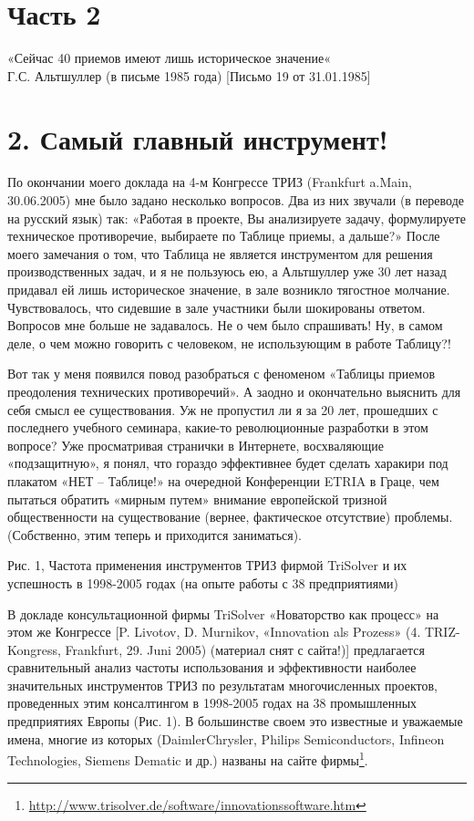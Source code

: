 \documentclass[11pt,a4paper]{article}
\begin{document}
\section*{Часть 2}
\begin{flushright}
  «Сейчас 40 приемов имеют лишь историческое значение«\\
  Г.С. Альтшуллер (в письме 1985 года)
  [Письмо 19 от 31.01.1985]
\end{flushright}
\section{2. Самый главный инструмент!}

По окончании моего доклада на 4-м Конгрессе ТРИЗ (Frankfurt a.Main,
30.06.2005) мне было задано несколько вопросов. Два из них звучали (в переводе
на русский язык) так: «Работая в проекте, Вы анализируете задачу, формулируете
техническое противоречие, выбираете по Таблице приемы, а дальше?» После моего
замечания о том, что Таблица не является инструментом для решения
производственных задач, и я не пользуюсь ею, а Альтшуллер уже 30 лет назад
придавал ей лишь историческое значение, в зале возникло тягостное молчание.
Чувствовалось, что сидевшие в зале участники были шокированы ответом. Вопросов
мне больше не задавалось. Не о чем было спрашивать! Ну, в самом деле, о чем
можно говорить с человеком, не использующим в работе Таблицу?!

Вот так у меня появился повод разобраться с феноменом «Таблицы приемов
преодоления технических противоречий». А заодно и окончательно выяснить для
себя смысл ее существования. Уж не пропустил ли я за 20 лет, прошедших с
последнего учебного семинара, какие-то революционные разработки в этом
вопросе? Уже просматривая странички в Интернете, восхваляющие «подзащитную», я
понял, что гораздо эффективнее будет сделать харакири под плакатом «НЕТ --
Таблице!» на очередной Конференции ETRIA в Граце, чем пытаться обратить
«мирным путем» внимание европейской тризной общественности на существование
(вернее, фактическое отсутствие) проблемы. (Собственно, этим теперь и
приходится заниматься).

Рис. 1, Частота применения инструментов ТРИЗ фирмой TriSolver и их успешность
в 1998-2005 годах (на опыте работы с 38 предприятиями)

В докладе консультационной фирмы TriSolver «Новаторство как процесс» на этом
же Конгрессе [P. Livotov, D. Murnikov, «Innovation als Prozess»
  (4. TRIZ-Kongress, Frankfurt, 29. Juni 2005) (материал снят с сайта!)]
предлагается сравнительный анализ частоты использования и эффективности
наиболее значительных инструментов ТРИЗ по результатам многочисленных
проектов, проведенных этим консалтингом в 1998-2005 годах на 38 промышленных
предприятиях Европы (Рис. 1). В большинстве своем это известные и уважаемые
имена, многие из которых (DaimlerChrysler, Philips Semiconductors, Infineon
Technologies, Siemens Dematic и др.) названы на сайте
фирмы\footnote{\url{http://www.trisolver.de/software/innovationssoftware.htm}}.
\end{document}

